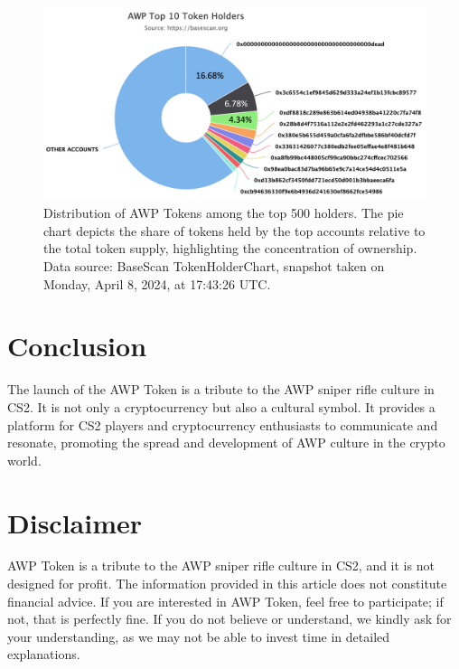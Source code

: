 \documentclass[journal,onecolumn,]{IEEEtran}
\begin{document}
	
	
	
	\begin{figure}[h]
		\centering
		\includegraphics[width=1\linewidth]{figure/token_distribution2.png}
		\caption{Distribution of AWP Tokens among the top 500 holders. The pie chart depicts the share of tokens held by the top accounts relative to the total token supply, highlighting the concentration of ownership. Data source: BaseScan TokenHolderChart, snapshot taken on Monday, April 8, 2024, at 17:43:26 UTC.}
		\label{pic:token_distribution}
	\end{figure}
	
	
	
	
	
	\section{Conclusion}
	The launch of the AWP Token is a tribute to the AWP sniper rifle culture in CS2. It is not only a cryptocurrency but also a cultural symbol. It provides a platform for CS2 players and cryptocurrency enthusiasts to communicate and resonate, promoting the spread and development of AWP culture in the crypto world.
	
	
	
	\section*{Disclaimer}
	
	AWP Token is a tribute to the AWP sniper rifle culture in CS2, and it is not designed for profit. The information provided in this article does not constitute financial advice. If you are interested in AWP Token, feel free to participate; if not, that is perfectly fine. If you do not believe or understand, we kindly ask for your understanding, as we may not be able to invest time in detailed explanations.
	
	
	\vfill
	
	 
	
	
	
	
	
\end{document}

